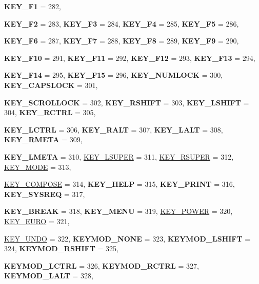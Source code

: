 \begin{DoxyCompactItemize}
{\bfseries KEY\_\-F1} =  282, 
\par
{\bfseries KEY\_\-F2} =  283, 
{\bfseries KEY\_\-F3} =  284, 
{\bfseries KEY\_\-F4} =  285, 
{\bfseries KEY\_\-F5} =  286, 
\par
{\bfseries KEY\_\-F6} =  287, 
{\bfseries KEY\_\-F7} =  288, 
{\bfseries KEY\_\-F8} =  289, 
{\bfseries KEY\_\-F9} =  290, 
\par
{\bfseries KEY\_\-F10} =  291, 
{\bfseries KEY\_\-F11} =  292, 
{\bfseries KEY\_\-F12} =  293, 
{\bfseries KEY\_\-F13} =  294, 
\par
{\bfseries KEY\_\-F14} =  295, 
{\bfseries KEY\_\-F15} =  296, 
{\bfseries KEY\_\-NUMLOCK} =  300, 
{\bfseries KEY\_\-CAPSLOCK} =  301, 
\par
{\bfseries KEY\_\-SCROLLOCK} =  302, 
{\bfseries KEY\_\-RSHIFT} =  303, 
{\bfseries KEY\_\-LSHIFT} =  304, 
{\bfseries KEY\_\-RCTRL} =  305, 
\par
{\bfseries KEY\_\-LCTRL} =  306, 
{\bfseries KEY\_\-RALT} =  307, 
{\bfseries KEY\_\-LALT} =  308, 
{\bfseries KEY\_\-RMETA} =  309, 
\par
{\bfseries KEY\_\-LMETA} =  310, 
\hyperlink{classphys_1_1MetaCode_a3e501cbb5bf0f6f1fdb7211465bda8d8aab77afaba4fc97faa9b9fe40d3a9ebbb}{KEY\_\-LSUPER} =  311, 
\hyperlink{classphys_1_1MetaCode_a3e501cbb5bf0f6f1fdb7211465bda8d8a84e2235ece031f83821867486ff52149}{KEY\_\-RSUPER} =  312, 
\hyperlink{classphys_1_1MetaCode_a3e501cbb5bf0f6f1fdb7211465bda8d8a9e26ea2006e876ccaa80fe4ae441da46}{KEY\_\-MODE} =  313, 
\par
\hyperlink{classphys_1_1MetaCode_a3e501cbb5bf0f6f1fdb7211465bda8d8aae92d5418d0273c8b43cb11f5e251a20}{KEY\_\-COMPOSE} =  314, 
{\bfseries KEY\_\-HELP} =  315, 
{\bfseries KEY\_\-PRINT} =  316, 
{\bfseries KEY\_\-SYSREQ} =  317, 
\par
{\bfseries KEY\_\-BREAK} =  318, 
{\bfseries KEY\_\-MENU} =  319, 
\hyperlink{classphys_1_1MetaCode_a3e501cbb5bf0f6f1fdb7211465bda8d8a08a2d04e3a40d746b81913e92a25a038}{KEY\_\-POWER} =  320, 
\hyperlink{classphys_1_1MetaCode_a3e501cbb5bf0f6f1fdb7211465bda8d8aee70075958d1650a7b48ba507103ec0c}{KEY\_\-EURO} =  321, 
\par
\hyperlink{classphys_1_1MetaCode_a3e501cbb5bf0f6f1fdb7211465bda8d8a15aabd8c4e36284ec057fafbda0d120a}{KEY\_\-UNDO} =  322, 
{\bfseries KEYMOD\_\-NONE} =  323, 
{\bfseries KEYMOD\_\-LSHIFT} =  324, 
{\bfseries KEYMOD\_\-RSHIFT} =  325, 
\par
{\bfseries KEYMOD\_\-LCTRL} =  326, 
{\bfseries KEYMOD\_\-RCTRL} =  327, 
{\bfseries KEYMOD\_\-LALT} =  328, 

\end{DoxyCompactItemize}
